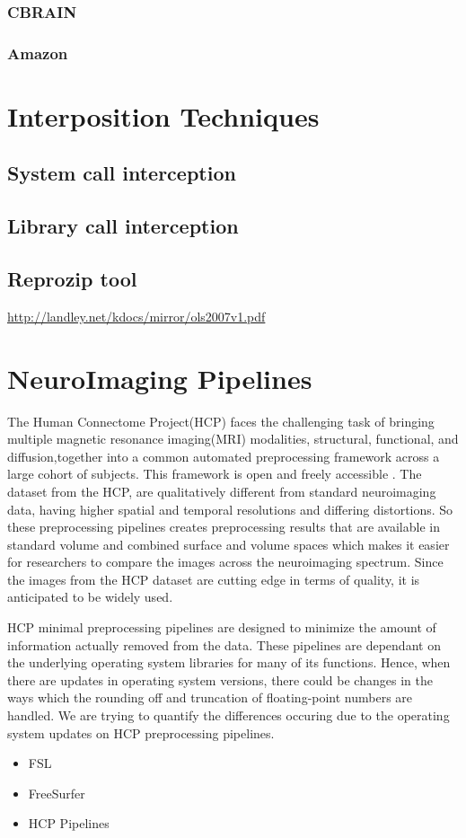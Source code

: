 \subsubsection{CBRAIN}
\subsubsection{Amazon}

\section{Interposition Techniques}
\subsection{System call interception}
\subsection{Library call interception}
\subsection{Reprozip tool}
\hyperref[System Call Interception]{http://landley.net/kdocs/mirror/ols2007v1.pdf}

\section{NeuroImaging Pipelines}
The Human Connectome Project(HCP) faces the challenging task of bringing multiple magnetic resonance imaging(MRI) modalities, structural, functional, and diffusion,together into a common automated preprocessing framework across a large cohort of subjects. This framework is open and freely accessible \cite{Gla13}. The dataset from the HCP, are qualitatively different from standard neuroimaging data, having higher spatial and temporal resolutions and differing distortions. So these preprocessing pipelines creates preprocessing results that are available in standard volume and combined surface and volume spaces which makes it easier for researchers to compare the images across the neuroimaging spectrum. Since the images from the HCP dataset are cutting edge in terms of quality, it is anticipated to be widely used.

HCP minimal preprocessing pipelines are designed to minimize the amount of information actually removed from the data. These pipelines are dependant on the underlying operating system libraries for many of its functions. Hence, when there are updates in operating system versions, there could be changes in the ways which the rounding off and truncation of floating-point numbers are handled. We are trying to quantify the differences occuring due to the operating system updates on HCP preprocessing pipelines.

\begin{itemize}
 \item FSL
 \item FreeSurfer
 \item HCP Pipelines
\end{itemize}


